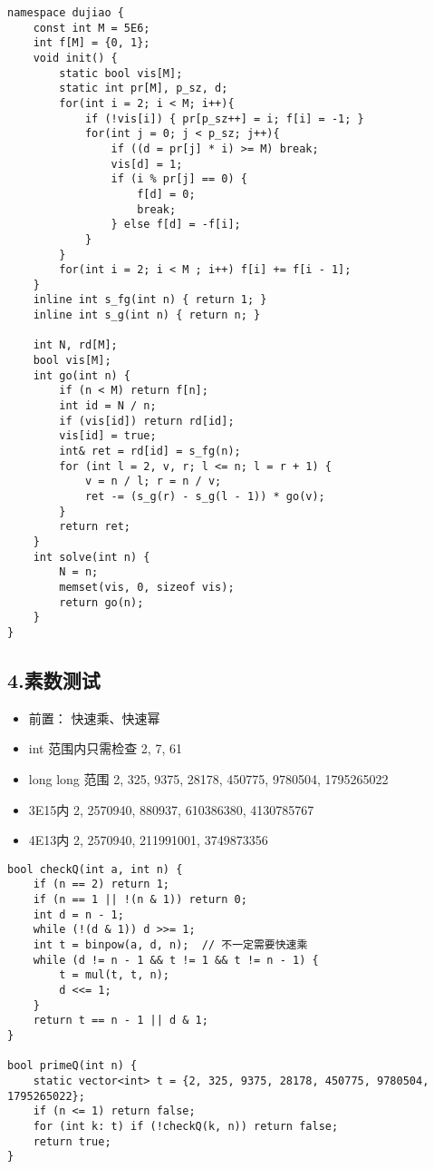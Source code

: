 \documentclass[]{article}
\providecommand{\tightlist}{%
  \setlength{\itemsep}{0pt}\setlength{\parskip}{0pt}}
\begin{document}
\begin{verbatim}
namespace dujiao {
    const int M = 5E6;
    int f[M] = {0, 1};
    void init() {
        static bool vis[M];
        static int pr[M], p_sz, d;
        for(int i = 2; i < M; i++){
            if (!vis[i]) { pr[p_sz++] = i; f[i] = -1; }
            for(int j = 0; j < p_sz; j++){
                if ((d = pr[j] * i) >= M) break;
                vis[d] = 1;
                if (i % pr[j] == 0) {
                    f[d] = 0;
                    break;
                } else f[d] = -f[i];
            }
        }
        for(int i = 2; i < M ; i++) f[i] += f[i - 1];
    }
    inline int s_fg(int n) { return 1; }
    inline int s_g(int n) { return n; }

    int N, rd[M];
    bool vis[M];
    int go(int n) {
        if (n < M) return f[n];
        int id = N / n;
        if (vis[id]) return rd[id];
        vis[id] = true;
        int& ret = rd[id] = s_fg(n);
        for (int l = 2, v, r; l <= n; l = r + 1) {
            v = n / l; r = n / v;
            ret -= (s_g(r) - s_g(l - 1)) * go(v);
        }
        return ret;
    }
    int solve(int n) {
        N = n;
        memset(vis, 0, sizeof vis);
        return go(n);
    }
}
\end{verbatim}

\hypertarget{ux7d20ux6570ux6d4bux8bd5}{%
\subsection{4.素数测试}\label{ux7d20ux6570ux6d4bux8bd5}}

\begin{itemize}
\tightlist
\item
  前置： 快速乘、快速幂
\item
  int 范围内只需检查 2, 7, 61
\item
  long long 范围 2, 325, 9375, 28178, 450775, 9780504, 1795265022
\item
  3E15内 2, 2570940, 880937, 610386380, 4130785767
\item
  4E13内 2, 2570940, 211991001, 3749873356
\end{itemize}

\begin{verbatim}
bool checkQ(int a, int n) {
    if (n == 2) return 1;
    if (n == 1 || !(n & 1)) return 0;
    int d = n - 1;
    while (!(d & 1)) d >>= 1;
    int t = binpow(a, d, n);  // 不一定需要快速乘
    while (d != n - 1 && t != 1 && t != n - 1) {
        t = mul(t, t, n);
        d <<= 1;
    }
    return t == n - 1 || d & 1;
}

bool primeQ(int n) {
    static vector<int> t = {2, 325, 9375, 28178, 450775, 9780504, 1795265022};
    if (n <= 1) return false;
    for (int k: t) if (!checkQ(k, n)) return false;
    return true;
}
\end{verbatim}
\end{document}
